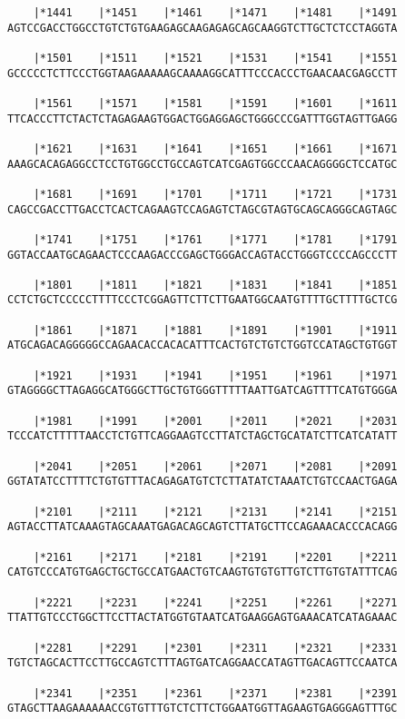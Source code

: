\documentclass{article}
\begin{document}
\begin{Verbatim}
    |*1441    |*1451    |*1461    |*1471    |*1481    |*1491
AGTCCGACCTGGCCTGTCTGTGAAGAGCAAGAGAGCAGCAAGGTCTTGCTCTCCTAGGTA
  
    |*1501    |*1511    |*1521    |*1531    |*1541    |*1551
GCCCCCTCTTCCCTGGTAAGAAAAAGCAAAAGGCATTTCCCACCCTGAACAACGAGCCTT
  
    |*1561    |*1571    |*1581    |*1591    |*1601    |*1611
TTCACCCTTCTACTCTAGAGAAGTGGACTGGAGGAGCTGGGCCCGATTTGGTAGTTGAGG
  
    |*1621    |*1631    |*1641    |*1651    |*1661    |*1671
AAAGCACAGAGGCCTCCTGTGGCCTGCCAGTCATCGAGTGGCCCAACAGGGGCTCCATGC
  
    |*1681    |*1691    |*1701    |*1711    |*1721    |*1731
CAGCCGACCTTGACCTCACTCAGAAGTCCAGAGTCTAGCGTAGTGCAGCAGGGCAGTAGC
  
    |*1741    |*1751    |*1761    |*1771    |*1781    |*1791
GGTACCAATGCAGAACTCCCAAGACCCGAGCTGGGACCAGTACCTGGGTCCCCAGCCCTT
  
    |*1801    |*1811    |*1821    |*1831    |*1841    |*1851
CCTCTGCTCCCCCTTTTCCCTCGGAGTTCTTCTTGAATGGCAATGTTTTGCTTTTGCTCG
  
    |*1861    |*1871    |*1881    |*1891    |*1901    |*1911
ATGCAGACAGGGGGCCAGAACACCACACATTTCACTGTCTGTCTGGTCCATAGCTGTGGT
  
    |*1921    |*1931    |*1941    |*1951    |*1961    |*1971
GTAGGGGCTTAGAGGCATGGGCTTGCTGTGGGTTTTTAATTGATCAGTTTTCATGTGGGA
  
    |*1981    |*1991    |*2001    |*2011    |*2021    |*2031
TCCCATCTTTTTAACCTCTGTTCAGGAAGTCCTTATCTAGCTGCATATCTTCATCATATT
  
    |*2041    |*2051    |*2061    |*2071    |*2081    |*2091
GGTATATCCTTTTCTGTGTTTACAGAGATGTCTCTTATATCTAAATCTGTCCAACTGAGA
  
    |*2101    |*2111    |*2121    |*2131    |*2141    |*2151
AGTACCTTATCAAAGTAGCAAATGAGACAGCAGTCTTATGCTTCCAGAAACACCCACAGG
  
    |*2161    |*2171    |*2181    |*2191    |*2201    |*2211
CATGTCCCATGTGAGCTGCTGCCATGAACTGTCAAGTGTGTGTTGTCTTGTGTATTTCAG
  
    |*2221    |*2231    |*2241    |*2251    |*2261    |*2271
TTATTGTCCCTGGCTTCCTTACTATGGTGTAATCATGAAGGAGTGAAACATCATAGAAAC
  
    |*2281    |*2291    |*2301    |*2311    |*2321    |*2331
TGTCTAGCACTTCCTTGCCAGTCTTTAGTGATCAGGAACCATAGTTGACAGTTCCAATCA
  
    |*2341    |*2351    |*2361    |*2371    |*2381    |*2391
GTAGCTTAAGAAAAAACCGTGTTTGTCTCTTCTGGAATGGTTAGAAGTGAGGGAGTTTGC
  

\end{Verbatim}
\end{document}
